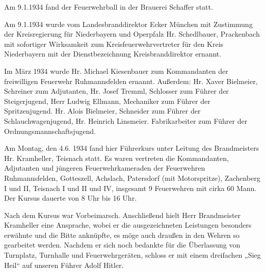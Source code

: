\documentclass[12pt,a4paper]{book}
\begin{document}
Am 9.1.1934 fand der Feuerwehrball in der Brauerei Schaffer statt.

Am 9.1.1934 wurde vom Landesbranddirektor Ecker München mit Zustimmung der
Kreisregierung für Niederbayern und Operpfalz Hr. Schedlbauer, Prackenbach mit
sofortiger Wirksamkeit zum Kreisfeuerwehrvertreter für den Kreis Niederbayern
mit der Dienstbezeichnung Kreisbranddirektor ernannt.

Im März 1934 wurde Hr. Michael Kiesenbauer zum Kommandanten der freiwilligen
Feuerwehr Ruhmannsfelden ernannt. Außerdem: Hr. Xaver Bielmeier, Schreiner zum
Adjutanten, Hr. Josef Tremml, Schlosser zum Führer der Steigerjugend, Herr
Ludwig Ellmann, Mechaniker zum Führer der Spritzenjugend. Hr. Alois Bielmeier,
Schneider zum Führer der Schlauchwagenjugend, Hr. Heinrich Linsmeier.
Fabrikarbeiter zum Führer der Ordnungsmannschaftsjugend.

Am Montag, den 4.6. 1934 fand hier Führerkurs unter Leitung des Brandmeisters
Hr. Kramheller, Teisnach statt. Es waren vertreten die Kommandanten, Adjutanten
und jüngeren Feuerwehrkameraden der Feuerwehren Ruhmannsfelden, Gotteszell,
Achslach, Patersdorf (mit Motorspritze), Zachenberg I und II, Teisnach I und II
und IV, insgesamt 9 Feuerwehren mit cirka 60 Mann. Der Kursus dauerte von 8 Uhr
bis 16 Uhr.

Nach dem Kursus war Vorbeimarsch. Anschließend hielt Herr Brandmeister
Kramheller eine Ansprache, wobei er die ausgezeichneten Leistungen besonders
erwähnte und die Bitte anknüpfte, es möge auch draußen in den Wehren so
gearbeitet werden. Nachdem er sich noch bedankte für die Überlassung von
Turnplatz, Turnhalle und Feuerwehrgeräten, schloss er mit einem dreifachen „Sieg
Heil“ auf unseren Führer Adolf Hitler.
\end{document}
